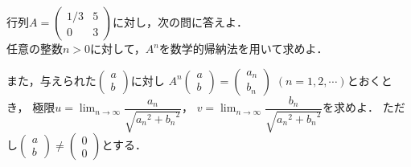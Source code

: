 \documentclass[../../main.tex]{subfiles}
\begin{document}
行列$A=
\begin{pmatrix} 1/3 & 5 \\ 0 & 3
\end{pmatrix}$に対し，次の問に答えよ．\\
任意の整数$n>0$に対して，$A^n$を数学的帰納法を用いて求めよ．

また，与えられた$
\begin{pmatrix} a \\ b
\end{pmatrix}$に対し
$A^n
\begin{pmatrix} a \\ b
\end{pmatrix}=
\begin{pmatrix} a_n \\ b_n
\end{pmatrix}$
$(n=1,2,\cdots)$とおくとき，
極限$\displaystyle u=\lim_{n\to\infty}\dfrac{a_n}{\sqrt{{a_n}^2+{b_n}^2}}$，
$\displaystyle v=\lim_{n\to\infty}\dfrac{b_n}{\sqrt{{a_n}^2+{b_n}^2}}$を求めよ．
ただし$
\begin{pmatrix} a \\ b
\end{pmatrix} \neq
\begin{pmatrix} 0 \\ 0
\end{pmatrix}$とする．
\end{document}

